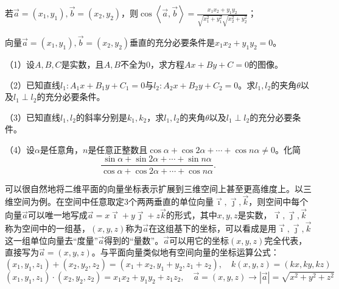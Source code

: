 若\(\vec{a} = \left( x_{1} , y_{1} \right) , \vec{b} = \left( x_{2} , y_{2} \right)\)，则\(\cos \left\langle \vec{a} , \vec{b} \right\rangle = \frac{x_{1} x_{2} + y_{1} y_{2}}{\sqrt{x_{1}^{2} + y_{1}^{2}} \sqrt{x_{2}^{2} + y_{2}^{2}}}\)；

向量\(\vec{a} = \left( x_{1} , y_{1} \right) , \vec{b} = \left( x_{2} , y_{2} \right)\)垂直的充分必要条件是\(x_{1} x_{2} + y_{1} y_{2} = 0\)。
\newpage
\begin{exercise}
    \mbox{}

    （1）设\(A , B , C\)是实数，且\(A , B\)不全为\(0\)，求方程\(A x + B y + C = 0\)的图像。

    （2）已知直线\(l_{1} : A_{1} x + B_{1} y + C_{1} = 0\)与\(l_{2} : A_{2} x + B_{2} y + C_{2} = 0\)。求\(l_{1} , l_{2}\)的夹角\(\theta\)以及\(l_{1} \perp l_{2}\)的充分必要条件。

    （3）已知直线\(l_{1} , l_{2}\)的斜率分别是\(k_{1} , k_{2}\)，求\(l_{1} , l_{2}\)的夹角\(\theta\)以及\(l_{1} \perp l_{2}\)的充分必要条件。

    （4）设\(\alpha\)是任意角，\(n\)是任意正整数且\(\cos \alpha + \cos 2 \alpha + \cdots + \cos n \alpha \ne 0\)。化简
    \begin{equation*}
        \frac{\sin \alpha + \sin 2 \alpha + \cdots + \sin n \alpha}{\cos \alpha + \cos 2 \alpha + \cdots + \cos n \alpha} .
    \end{equation*}
\end{exercise}

可以很自然地将二维平面的向量坐标表示扩展到三维空间上甚至更高维度上。以三维空间为例。在空间中任意取定3个两两垂直的单位向量\(\vec{\imath} , \vec{\jmath} , \vec{k}\)，则空间中每个向量\(\vec{a}\)可以唯一地写成\(\vec{a} = x \vec{\imath} + y \vec{\jmath} + z \vec{k}\)的形式，其中\(x , y , z\)是实数，\(\vec{\imath} , \vec{\jmath} , \vec{k}\)称为空间中的一组基，\(\left( x , y , z \right)\)称为\(\vec{a}\)在这组基下的坐标，可以看成是用\(\vec{\imath} , \vec{\jmath} , \vec{k}\)这一组单位向量去“度量”\(\vec{a}\)得到的“量数”。\(\vec{a}\)可以用它的坐标\(\left( x , y , z \right)\)完全代表，直接写为\(\vec{a} = \left( x , y , z \right)\)。与平面向量类似地有空间向量的坐标运算公式：
\begin{equation*}
    \left( x_{1} , y_{1} , z_{1} \right) + \left( x_{2} , y_{2} , z_{2} \right) = \left( x_{1} + x_{2} , y_{1} + y_{2} , z_{1} + z_{2} \right) , \quad k \left( x , y , z \right) = \left( k x , k y , k z \right)
\end{equation*}
\begin{equation*}
    \left( x_{1} , y_{1} , z_{1} \right) \cdot \left( x_{2} , y_{2} , z_{2} \right) = x_{1} x_{2} + y_{1} y_{2} + z_{1} z_{2} , \quad \vec{a} = \left( x , y , z \right) \to \left| \vec{a} \right| = \sqrt{x^{2} + y^{2} + z^{2}}
\end{equation*}

